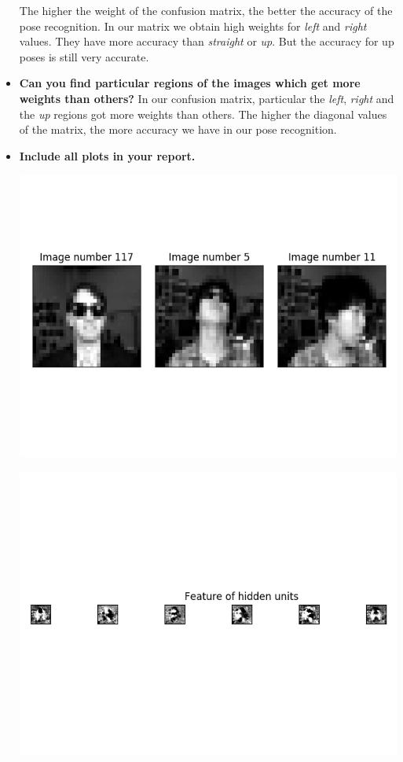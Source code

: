 \documentclass[a4paper]{article}
\begin{document}
\begin{itemize}
\noindent
The higher the weight of the confusion matrix, the better the accuracy of the pose recognition. In our matrix we obtain high weights for \textit{left} and \textit{right} values. They have more accuracy than \textit{straight} or \textit{up}. But the accuracy for up poses is still very accurate.

\item \textbf{Can you find particular regions of the images which get more weights than others?}
\newline \newline
In our confusion matrix, particular the \textit{left}, \textit{right} and the \textit{up} regions got more weights than others. The higher the diagonal values of the matrix, the more accuracy we have in our pose recognition.

\item \textbf{Include all plots in your report.} \\
\begin{minipage}{0.4\textwidth}
  \includegraphics[scale=0.35]{plots/pose_recognition.png}
  \label{pose_recognition}
\end{minipage}
\hfill
\begin{minipage}{0.4\textwidth}
  \includegraphics[scale=0.35]{plots/pose_recognition_hidden_units.png}

\end{minipage}
\end{itemize}
\end{document}
